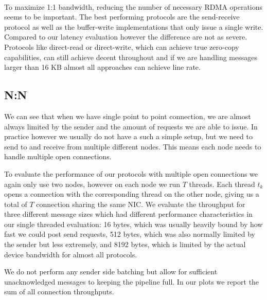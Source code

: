 \paragraph{} To maximize 1:1 bandwidth, reducing the number of necessary RDMA operations seems to be important.
The best performing protocols are the send-receive 
protocol as well as the buffer-write implementations that only issue a single write. Compared to our latency evaluation
however the difference are not as severe. 
Protocols like direct-read or direct-write, which can achieve true zero-copy capabilities, can still achieve decent 
throughout and if we are handling messages larger than 16 KB almost all approaches can achieve line rate.








\pagebreak
\subsection{N:N}


We can see that when we have single point to point connection, we are almost always limited by the sender and the 
amount of requests we are able to issue. In practice however we usually do not have a such a simple setup, but we
need to send to and receive from multiple different nodes. This means each node needs to handle multiple open
connections. 

To evaluate the performance of our protocols with multiple open connections we again only use two nodes, however  
on each node we run $T$ threads. Each thread $t_k$ opens a connection with the corresponding 
thread on the other node, giving us a total of $T$ connection sharing the same NIC. We evaluate the throughput for 
three different message sizes which had different performance characteristics in our single threaded evaluation: 16 bytes, 
which was usually heavily bound by how fast we could post send requests, 512 bytes, which was also normally limited by the 
sender but less extremely, and 8192 bytes, which is limited by the actual device bandwidth for almost all protocols. 

We do not perform any sender side batching but allow for sufficient unacknowledged messages to keeping the pipeline full.
In our plots we report the sum of all connection throughputs.

